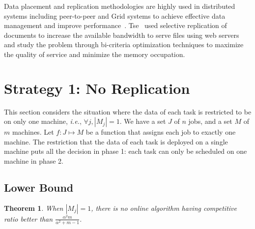 \documentclass[10pt, conference, compsocconf]{IEEEtran}
\newtheorem{theorem}{Theorem}
\begin{document}
Data placement and replication methodologies are highly used in
distributed systems including peer-to-peer and Grid systems to achieve
effective data management and improve
performance~\cite{Cirne2007213}\cite{Abawajy}\cite{4215379}. Tse~\cite{DBLP:journals/tc/Tse12}
used selective replication of documents to increase the available
bandwidth to serve files using web servers and study the problem
through bi-criteria optimization techniques to maximize the quality of
service and minimize the memory occupation.

\section{Strategy 1: No Replication}\label{sec4}


This section considers the situation where the data of each task is
restricted to be on only one machine, {\em i.e.}, $\forall j, |M_j|=1$.  We
have a set $J$ of $ n$ jobs, and a set $M$ of $m$ machines.  Let $f :
J \mapsto M$ be a function that assigns each job to exactly one
machine. The restriction that the data of each task is deployed on a
single machine puts all the decision in phase 1: each task can only be
scheduled on one machine in phase 2.

\subsection{Lower Bound}


\begin{theorem}
\label{th:model1-lb}
  When $|M_j| = 1$, there is no online algorithm having competitive
  ratio better than $\frac{\alpha^{2}m }{\alpha^{2} + m-1}$.
\end{theorem}
 
\end{document}
